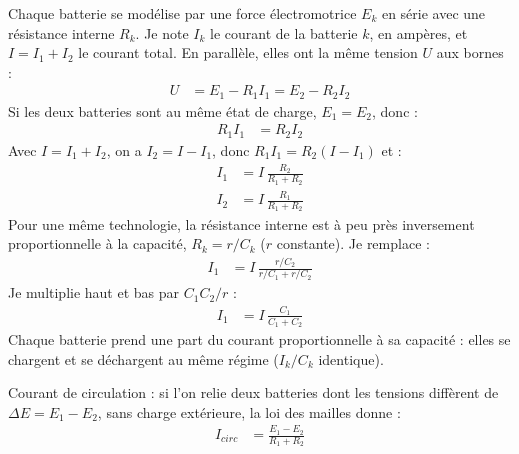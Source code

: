 \begin{demonstration}
Chaque batterie se modélise par une force électromotrice $E_k$ en série avec une résistance interne $R_k$. Je note $I_k$ le courant de la batterie $k$, en ampères, et $I = I_1 + I_2$ le courant total. En parallèle, elles ont la même tension $U$ aux bornes :
\begin{align*}
U &= E_1 - R_1 I_1 = E_2 - R_2 I_2
\end{align*}
Si les deux batteries sont au même état de charge, $E_1 = E_2$, donc :
\begin{align*}
R_1 I_1 &= R_2 I_2
\end{align*}
Avec $I = I_1 + I_2$, on a $I_2 = I - I_1$, donc $R_1 I_1 = R_2 (I - I_1)$ et :
\begin{align*}
I_1 &= I\,\frac{R_2}{R_1 + R_2}\\
I_2 &= I\,\frac{R_1}{R_1 + R_2}
\end{align*}
Pour une même technologie, la résistance interne est à peu près inversement proportionnelle à la capacité, $R_k = r/C_k$ ($r$ constante). Je remplace :
\begin{align*}
I_1 &= I\,\frac{r/C_2}{r/C_1 + r/C_2}
\end{align*}
Je multiplie haut et bas par $C_1 C_2/r$ :
\begin{align*}
I_1 &= I\,\frac{C_1}{C_1 + C_2}
\end{align*}
Chaque batterie prend une part du courant proportionnelle à sa capacité : elles se chargent et se déchargent au même régime ($I_k/C_k$ identique).

Courant de circulation : si l'on relie deux batteries dont les tensions diffèrent de $\Delta E = E_1 - E_2$, sans charge extérieure, la loi des mailles donne :
\begin{align*}
I_{circ} &= \frac{E_1 - E_2}{R_1 + R_2}
\end{align*}
\end{demonstration}

